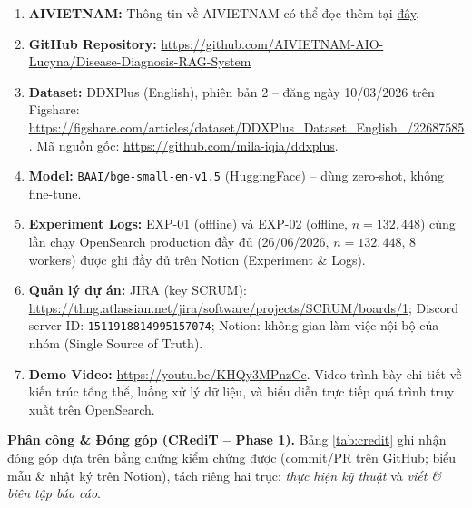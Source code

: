 \newpage
\begin{appendices}
  \begin{enumerate}
    \item \textbf{AIVIETNAM:} Thông tin về AIVIETNAM có thể đọc thêm tại \href{https://aivietnam.edu.vn/}{đây}.
    \item \textbf{GitHub Repository:} \url{https://github.com/AIVIETNAM-AIO-Lucyna/Disease-Diagnosis-RAG-System}
    \item \textbf{Dataset:} DDXPlus (English), phiên bản 2 -- đăng ngày 10/03/2026 trên Figshare: \url{https://figshare.com/articles/dataset/DDXPlus_Dataset_English_/22687585}. Mã nguồn gốc: \url{https://github.com/mila-iqia/ddxplus}.
    \item \textbf{Model:} \texttt{BAAI/bge-small-en-v1.5} (HuggingFace) -- dùng zero-shot, không fine-tune.
    \item \textbf{Experiment Logs:} EXP-01 (offline) và EXP-02 (offline, $n=132{,}448$) cùng lần chạy OpenSearch production đầy đủ (26/06/2026, $n=132{,}448$, 8 workers) được ghi đầy đủ trên Notion (Experiment \& Logs).
    \item \textbf{Quản lý dự án:} JIRA (key SCRUM): \url{https://thng.atlassian.net/jira/software/projects/SCRUM/boards/1}; Discord server ID: \texttt{1511918814995157074}; Notion: không gian làm việc nội bộ của nhóm (Single Source of Truth).
    \item \textbf{Demo Video:} \url{https://youtu.be/KHQy3MPnzCc}. Video trình bày chi tiết về kiến trúc tổng thể, luồng xử lý dữ liệu, và biểu diễn trực tiếp quá trình truy xuất trên OpenSearch.
  \end{enumerate}

  \bigskip
  \noindent\textbf{Phân công \& Đóng góp (CRediT -- Phase 1).} Bảng \ref{tab:credit} ghi nhận đóng góp dựa trên bằng chứng kiểm chứng được (commit/PR trên GitHub; biểu mẫu \& nhật ký trên Notion), tách riêng hai trục: \textit{thực hiện kỹ thuật} và \textit{viết \& biên tập báo cáo}.


\end{appendices}
